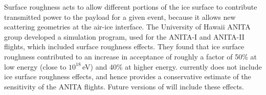 Surface roughness acts to allow different portions of the ice surface to contribute transmitted power to the payload for a given event, because it allows new scattering geometries at the air-ice interface.
The University of Hawaii ANITA group developed a simulation program, used for the ANITA-I and ANITA-II flights, which included surface roughness effects. They found that ice surface roughness contributed to an increase in acceptance of roughly a factor of 50\% at low energy (close to $10^{18}$\,eV) and 40\% at higher energy.
\icemc currently does not include ice surface roughness effects, and hence provides a conservative estimate of the sensitivity of the ANITA flights. Future versions of \icemc will include these effects.



